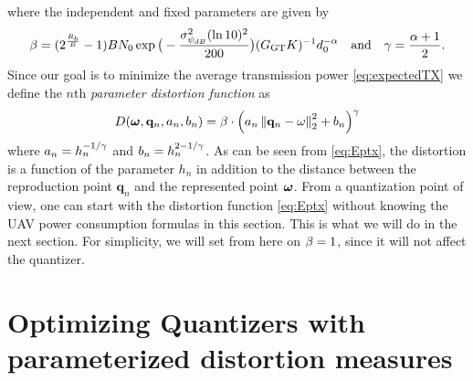 \documentclass[12pt,onecolumn,final,letterpaper]{IEEEtran}
\renewcommand{\vp}{\mathbf q}
\newcommand{\Rb}{\ensuremath{R_b}}         %
\newcommand{\GGT}{\ensuremath{G_{\text{GT}}}}         %
\begin{document}
%
where the independent and fixed parameters are given by
%
\begin{align}
  \bet=(2^{\frac{\Rb}{B}}-1)B N_0 \exp\big(-\frac{\sig_{\psi_{dB}}^2 (\ln 10)^2}{200}\big)(\GGT K)^{-1}
  d_0^{-\alp}\quad\text{and}\quad
  \gam=\frac{\alp+1}{2}.
\end{align}
%
Since our goal is to minimize the average transmission power \eqref{eq:expectedTX} we define 
the $n$th \emph{parameter distortion function} as
%
\begin{align}
  D(\vome,\vp_n,a_n,b_n)=\bet\cdot  \left(a_n\Norm{\vp_n-\ome}_2^2+b_n\right)^\gam
  \label{eq:Eptx}
\end{align}
%
where $a_n=h_n^{-1/\gamma}$ and $b_n=h_n^{2-1/\gamma}$.  As can be seen from \eqref{eq:Eptx}, the distortion is a function
of the parameter $h_n$ in addition to the distance between the reproduction point $\vp_n$ and the represented point
$\boldsymbol{ \omega}$. From a quantization point of view, one can start with the distortion function \eqref{eq:Eptx} without knowing the UAV
power consumption formulas in this section. This is what we will do in the next section.  For simplicity, we will set
from here on $\beta=1$, since it will not affect the quantizer. 


\section{Optimizing Quantizers with parameterized distortion measures}\label{sec:optmize1D}
\end{document}
